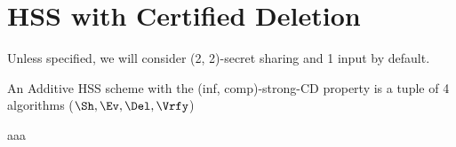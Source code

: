
\section{HSS with Certified Deletion}\label{sec:hss-cd}

Unless specified, we will consider (2, 2)-secret sharing and 1 input
by default.

\begin{definition}
An Additive HSS scheme with the (inf, comp)-strong-CD property is a
tuple of 4 algorithms ($\Sh, \Ev, \Del, \Vrfy$)
\end{definition}

aaa

